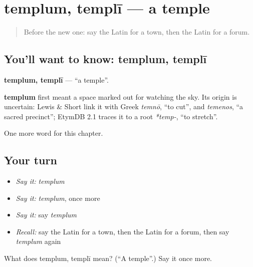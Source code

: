 \section[templum, templī]{templum, templī — a temple}

\label{lesson:LA-C107-templum}



\begin{quote}
Before the new one: say the Latin for a town, then the Latin for a forum.
\end{quote}

\subsection*{You'll want to know: templum, templī}
\textbf{templum, templī} — \textquotedblleft{}a temple\textquotedblright{}.

\begin{cousinweb}
\textbf{templum} first meant a space marked out for watching the sky. Its origin is uncertain: Lewis \& Short link it with Greek \emph{temnō}, \textquotedblleft{}to cut\textquotedblright{}, and \emph{temenos}, \textquotedblleft{}a sacred precinct\textquotedblright{}; EtymDB 2.1 traces it to a root \emph{*temp-}, \textquotedblleft{}to stretch\textquotedblright{}.
\end{cousinweb}

\begin{grammarlens}[title={What you've built}]
One more word for this chapter.
\end{grammarlens}

\subsection*{Your turn}
\begin{itemize}
\raggedright
  \item \emph{Say it:} \emph{templum}
  \item \emph{Say it:} \emph{templum}, once more
  \item \emph{Say it:} say \emph{templum}
  \item \emph{Recall:} say the Latin for a town, then the Latin for a forum, then say \emph{templum} again
\end{itemize}

\begin{tcolorbox}[breakable,colback=teal!4,colframe=teal!35!black,title={Before you move on}]
What does templum, templī mean? (\textquotedblleft{}A temple\textquotedblright{}.) Say it once more.
\end{tcolorbox}
